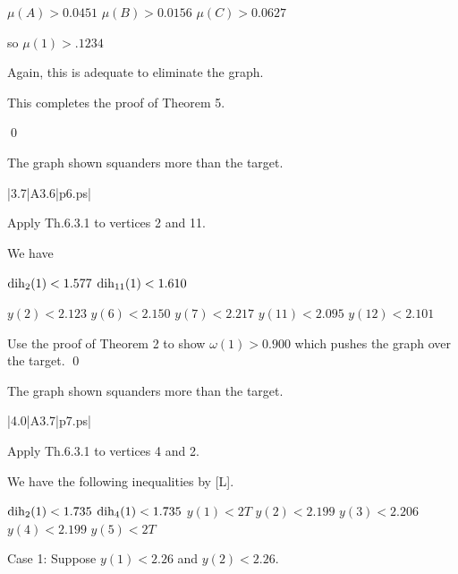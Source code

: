 $\mu(A)>0.0451$ \newline
$\mu(B)>0.0156$ \newline
$\mu(C)>0.0627$ \newline

so $\mu(1)>.1234$

Again, this is adequate to eliminate the graph.

This completes the proof of Theorem 5.

\qed

\bigskip



 The graph shown 
squanders more than the target.  \endproclaim

\gram|3.7|A3.6|p6.ps|  %

Apply Th.6.3.1 to vertices 2 and 11.

We have 

$\operatorname{dih}_2(1) < 1.577$ \newline
$\operatorname{dih}_{11}(1) < 1.610$ \newline

$y(2)<2.123$ \newline
$y(6)<2.150$ \newline
$y(7)<2.217$ \newline
$y(11)<2.095$ \newline
$y(12)<2.101$ \newline

Use the proof of Theorem 2 to show $\omega(1)>0.900$ which pushes the graph over the target. \qed

\bigskip

 The graph shown 
squanders more than the target.  \endproclaim

\gram|4.0|A3.7|p7.ps|  %

Apply Th.6.3.1 to vertices 4 and 2.

We have the following inequalities by [L].

$\operatorname{dih}_2(1) < 1.735$ \newline
$\operatorname{dih}_4(1) < 1.735$ \newline
$y(1)<2T$ \newline
$y(2)<2.199$ \newline
$y(3)<2.206$ \newline
$y(4)<2.199$ \newline
$y(5)<2T$ \newline


Case 1: Suppose $y(1)<2.26$ and $y(2)<2.26.$

